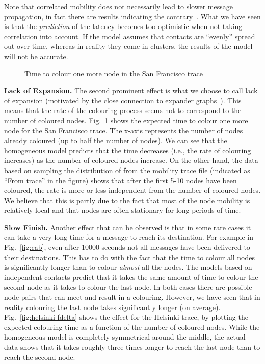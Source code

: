 \documentclass{article}
\begin{document}
Note that correlated mobility does not necessarily lead to slower
message propagation, in fact there are results indicating the
contrary~\cite{ciullo11}. What we have seen is that the \emph{prediction} of
the latency becomes too optimistic when not taking correlation into
account. If the model assumes that contacts are ``evenly'' spread out
over time, whereas in reality they come in clusters, the results of
the model will not be accurate.

\begin{figure}[tb]
  \centering
   \caption{Time to colour one more node in the San Francisco trace}
  \label{fig:cabcol}
\end{figure}

{\bf Lack of Expansion.} The second prominent effect is what we choose
to call lack of expansion (motivated by the close connection to
expander graphs~\cite{asplund12worst}). This means that the rate of
the colouring process seems not to correspond to the number of
coloured nodes. Fig.~\ref{fig:cabcol} shows the expected time to
colour one more node for the San Francisco trace. The x-axis
represents the number of nodes already coloured (up to half the number
of nodes). We can see that the homogeneous model predicts that the
time decreases (i.e., the rate of colouring increases) as the number
of coloured nodes increase. On the other hand, the data based on
sampling the distribution of  from the mobility trace file
(indicated as ``From trace'' in the figure) shows that after the first
5-10 nodes have been coloured, the rate is more or less independent
from the number of coloured nodes. We believe that this is partly due
to the fact that most of the node mobility is relatively local and
that nodes are often stationary for long periods of time.
 
{\bf Slow Finish.} Another effect that can be observed is that in some
rare cases it can take a very long time for a message to reach its
destination. For example in Fig.~\ref{fig:cab}, even after 10000
seconds not all messages have been delivered to their destinations. This
has to do with the fact that the time to colour all nodes is
significantly longer than to colour \emph{almost} all the nodes. The
models based on independent contacts predict that it takes the same
amount of time to colour the second node as it takes to colour the
last node. In both cases there are  possible node pairs that can
meet and result in a colouring. However, we have seen that in reality
colouring the last node takes significantly longer (on
average). Fig.~\ref{fig:helsinki-fdelta} shows the effect for the
Helsinki trace, by plotting the expected colouring time as a function
of the number of coloured nodes. While the homogeneous model is
completely symmetrical around the middle, the actual data shows that
it takes roughly three times longer to reach the last node than to
reach the second node.
\end{document}
